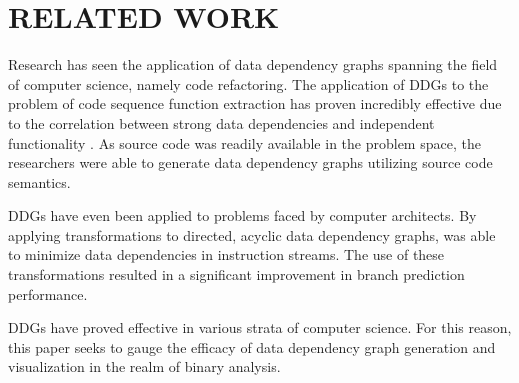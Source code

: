 \chapter{RELATED WORK}
Research has seen the application of data dependency graphs spanning the field of computer science, namely code refactoring. The application of DDGs to the problem of code sequence function extraction has proven incredibly effective due to the correlation between strong data dependencies and independent functionality \citep{kanemitsu2011visualization}. As source code was readily available in the problem space, the researchers were able to generate data dependency graphs utilizing source code semantics.

DDGs have even been applied to problems faced by computer architects. By applying transformations to directed, acyclic data dependency graphs, \citet{heffernan2006data} was able to minimize data dependencies in instruction streams. The use of these transformations resulted in a significant improvement in branch prediction performance. 

DDGs have proved effective in various strata of computer science. For this reason, this paper seeks to gauge the efficacy of data dependency graph generation and visualization in the realm of binary analysis.  